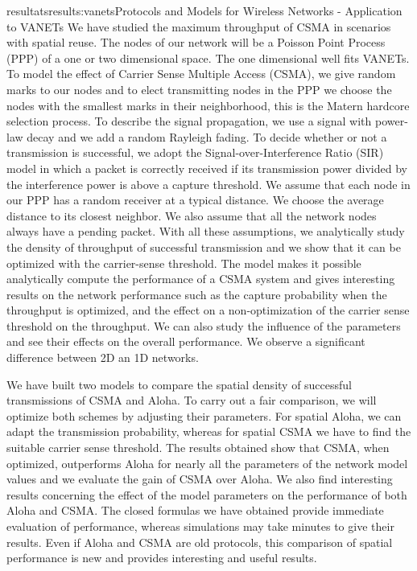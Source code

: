 \documentclass{ra2016}
\begin{document}
\begin{module}{resultats}{results:vanets}{Protocols and Models for Wireless Networks - Application to VANETs}
We have studied  the maximum throughput of CSMA in scenarios with spatial reuse.
The nodes of our network will be a Poisson Point Process (PPP) of a one or two dimensional space.
The one dimensional well fits VANETs.
To model the effect of Carrier Sense Multiple Access (CSMA), we give random marks to our nodes and to elect transmitting nodes in the PPP we choose the nodes with the smallest marks in their neighborhood, this is the Matern hardcore selection process.
To describe the signal propagation, we use a signal with power-law decay and we add a random Rayleigh fading.
To decide whether or not a transmission is successful, we adopt the Signal-over-Interference Ratio (SIR) model in which a packet is correctly received if its transmission power divided by the interference power is above a capture threshold.
We assume that each node in our PPP has a random receiver at a typical distance.
We choose the average distance to its closest neighbor.
We also assume that all the network nodes always have a pending packet.
With all these assumptions, we analytically study the density of throughput of successful transmission and we show that it can be optimized with the carrier-sense threshold. 
 The model makes it possible analytically compute the 
 performance of a CSMA system and gives 
 interesting results on the network performance such as the capture probability 
 when the throughput is optimized, and the effect on a non-optimization of the 
 carrier sense threshold on the throughput. We can also study the influence 
of the parameters and  see their effects on the overall performance. 
We observe a significant difference between 2D an 1D networks.


We have built two models  to compare the spatial density of successful 
transmissions of CSMA and Aloha. 
To carry out a  fair comparison, we will optimize both schemes by adjusting their parameters. 
For spatial Aloha, we can adapt the 
transmission probability, whereas for spatial CSMA we have to find the suitable carrier sense threshold. The results obtained show that CSMA, when optimized, outperforms Aloha 
for nearly all the parameters of the network model values 
and we evaluate the gain of CSMA over Aloha. 
We also find interesting results concerning the effect of the model parameters on the performance 
of both Aloha and CSMA. 
The closed formulas we have obtained provide immediate evaluation of performance, whereas 
simulations may take minutes to give their results. Even if Aloha and CSMA are old protocols, 
this comparison of spatial performance is new and provides interesting and useful results. 


\end{module}
\end{document}
